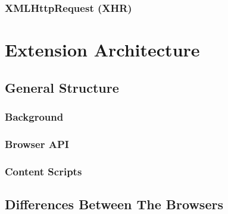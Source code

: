 \subsubsection{XMLHttpRequest (XHR)}

\section{Extension Architecture}
	
\subsection{General Structure}

\subsubsection{Background} 

\subsubsection{Browser API}

\subsubsection{Content Scripts}
			
\subsection{Differences Between The Browsers}


